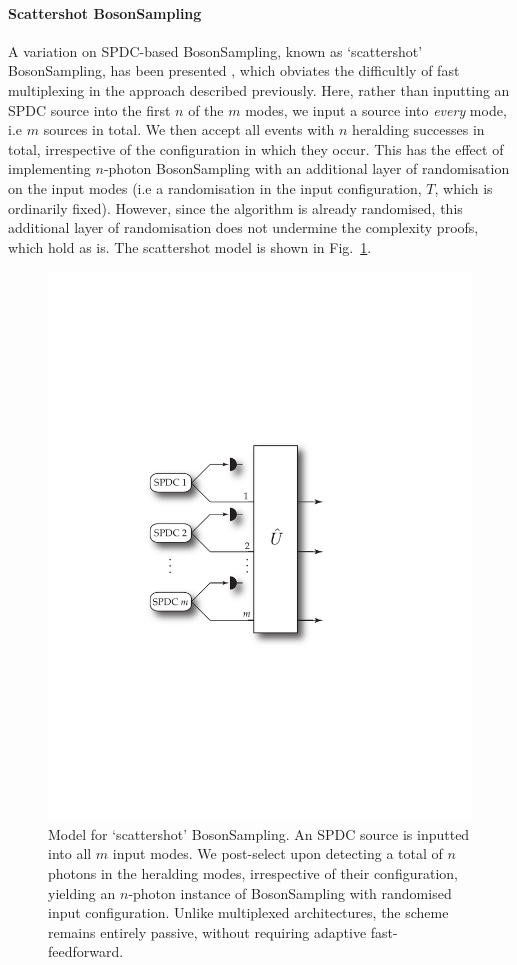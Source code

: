 \documentclass[aps, rmp, twocolumn, amsmath, amssymb, nofootinbib, superscriptaddress, longbibliography, floatfix, table-of-contents, eqsecnum]{revtex4-1}
\begin{document}
\paragraph{Scattershot {\sc BosonSampling}} 

A variation on SPDC-based {\sc BosonSampling}, known as `scattershot' {\sc BosonSampling}, has been presented \cite{bib:RandBS}, which obviates the difficultly of fast multiplexing in the approach described previously. Here, rather than inputting an SPDC source into the first $n$ of the $m$ modes, we input a source into \textit{every} mode, i.e $m$ sources in total. We then accept all events with $n$ heralding successes in total, irrespective of the configuration in which they occur. This has the effect of implementing $n$-photon {\sc BosonSampling} with an additional layer of randomisation on the input modes (i.e a randomisation in the input configuration, $T$, which is ordinarily fixed). However, since the algorithm is already randomised, this additional layer of randomisation does not undermine the complexity proofs, which hold as is. The scattershot model is shown in Fig.~\ref{fig:scattershot_model}.

\begin{figure}[!htb]
\includegraphics[width=0.7\columnwidth]{scattershot_model}
\caption{Model for `scattershot' {\sc BosonSampling}. An SPDC source is inputted into all $m$ input modes. We post-select upon detecting a total of $n$ photons in the heralding modes, irrespective of their configuration, yielding an $n$-photon instance of {\sc BosonSampling} with randomised input configuration. Unlike multiplexed architectures, the scheme remains entirely passive, without requiring adaptive fast-feedforward.} \label{fig:scattershot_model}
\end{figure}
\end{document}

